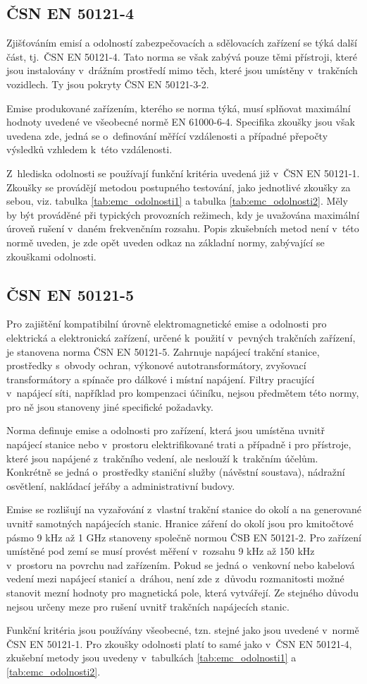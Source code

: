 \subsection{ČSN EN 50121-4}
Zjišťováním emisí a odolností zabezpečovacích a sdělovacích zařízení se týká další část, tj.~ČSN EN 50121-4. Tato norma se však zabývá pouze těmi přístroji, které jsou instalovány v~drážním prostředí mimo těch, které jsou umístěny v~trakčních vozidlech. Ty jsou pokryty ČSN EN 50121-3-2. 

Emise produkované zařízením, kterého se norma týká, musí splňovat maximální hodnoty uvedené ve všeobecné normě EN 61000-6-4. Specifika zkoušky jsou však uvedena zde, jedná se o~definování měřící vzdálenosti a případné přepočty výsledků vzhledem k~této vzdálenosti.

Z~hlediska odolnosti se používají funkční kritéria uvedená již v~ČSN EN 50121-1. Zkoušky se provádějí metodou postupného testování, jako jednotlivé zkoušky za sebou, viz. tabulka \ref{tab:emc_odolnosti1} a tabulka \ref{tab:emc_odolnosti2}.
 Měly by být prováděné při typických provozních režimech, kdy je uvažována maximální úroveň rušení v~daném frekvenčním rozsahu. Popis zkušebních metod není v~této normě uveden, je zde opět uveden odkaz na základní normy, zabývající se zkouškami odolnosti. 

\subsection{ČSN EN 50121-5}
Pro zajištění kompatibilní úrovně elektromagnetické emise a odolnosti pro elektrická a elektronická zařízení, určené k~použití v~pevných trakčních zařízení, je stanovena norma ČSN EN 50121-5. Zahrnuje  napájecí trakční stanice, prostředky s~obvody ochran, výkonové autotransformátory, zvyšovací transformátory a spínače pro dálkové i místní napájení. Filtry pracující v~napájecí síti, například pro kompenzaci účiníku, nejsou předmětem této normy,  pro ně jsou stanoveny jiné specifické požadavky. 

Norma definuje emise a odolnosti pro zařízení, která jsou umístěna uvnitř napájecí stanice nebo v~prostoru elektrifikované trati a případně i pro přístroje, které jsou napájené z~trakčního vedení, ale neslouží k~trakčním účelům. Konkrétně se jedná o~prostředky staniční služby (návěstní soustava), nádražní osvětlení, nakládací jeřáby a administrativní budovy.  

Emise se rozlišují na vyzařování z~vlastní trakční stanice do okolí a na generované uvnitř samotných napájecích stanic. Hranice záření do okolí jsou pro kmitočtové pásmo 9 kHz až 1 GHz stanoveny společně normou ČSB EN 50121-2. Pro zařízení umístěné pod zemí se musí provést měření v~rozsahu 9 kHz až 150 kHz v~prostoru na povrchu nad zařízením. Pokud se jedná o~venkovní nebo kabelová vedení mezi napájecí stanicí a~dráhou, není zde z~důvodu rozmanitosti možné stanovit mezní hodnoty pro magnetická pole, která vytvářejí. Ze stejného důvodu nejsou určeny meze pro rušení uvnitř trakčních napájecích stanic. 

Funkční kritéria jsou používány všeobecné, tzn. stejné jako jsou uvedené v~normě ČSN EN 50121-1. Pro zkoušky odolnosti platí to samé jako v~ČSN EN 50121-4, zkušební metody jsou uvedeny v~tabulkách \ref{tab:emc_odolnosti1} a \ref{tab:emc_odolnosti2}.
